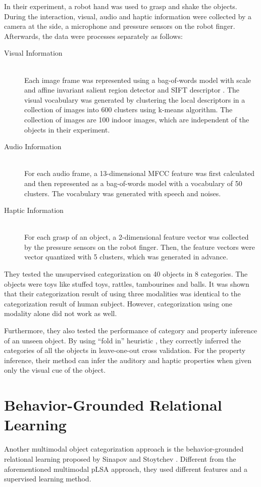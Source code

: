 \documentclass[12pt,final,twoside]{report}
\theoremstyle{plain}
\theoremstyle{definition}
\theoremstyle{remark}
\begin{document}
In their experiment, a robot hand was used to grasp and shake the objects. During the interaction, visual, audio and haptic information were collected by a camera at the side, a microphone and pressure sensors on the robot finger. Afterwards, the data were processes separately as follows:
\begin{description}
  \item[Visual Information] \hfill \\
    Each image frame was represented using a bag-of-words model with scale and affine invariant salient region detector \cite{mikolajczyk_scale_2004} and SIFT descriptor \cite{lowe_distinctive_2004}. The visual vocabulary was generated by clustering the local descriptors in a collection of images into 600 clusters using k-means algorithm. The collection of images are 100 indoor images, which are independent of the objects in their experiment.
  \item[Audio Information] \hfill \\
    For each audio frame, a 13-dimensional MFCC feature was first calculated and then represented as a bag-of-words model with a vocabulary of 50 clusters. The vocabulary was generated with speech and noises.
  \item[Haptic Information] \hfill \\
    For each grasp of an object, a 2-dimensional feature vector was collected by the pressure sensors on the robot finger. Then, the feature vectors were vector quantized with 5 clusters, which was generated in advance.
\end{description}

They tested the unsupervised categorization on 40 objects in 8 categories. The objects were toys like stuffed toys, rattles, tambourines and balls. It was shown that their categorization result of using three modalities was identical to the categorization result of human subject. However, categorization using one modality alone did not work as well.

Furthermore, they also tested the performance of category and property inference of an unseen object. By using ``fold in'' heuristic \cite{hofmann_probabilistic_1999}, they correctly inferred the categories of all the objects in leave-one-out cross validation. For the property inference, their method can infer the auditory and haptic properties when given only the visual cue of the object.

\section{Behavior-Grounded Relational Learning}
Another multimodal object categorization approach is the behavior-grounded relational learning proposed by Sinapov and Stoytchev \cite{sinapov_object_2011}. Different from the aforementioned multimodal pLSA approach, they used different features and a supervised learning method.
\end{document}
